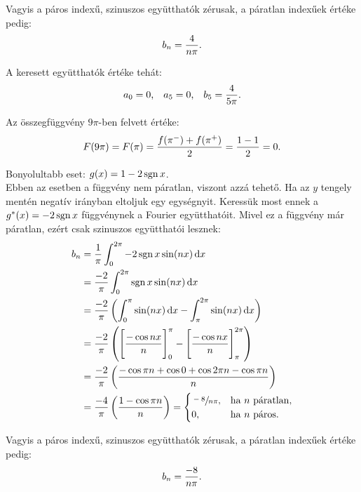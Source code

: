 \begin{exercise}
{    Vagyis a páros indexű, szinuszos együtthatók zérusak, a páratlan indexűek
    értéke pedig:
    \[
      b_n = \frac{4}{n\pi}
      \text.
    \]

    A keresett együtthatók értéke tehát:
    \[
      a_0 = 0
      \text,
      \quad
      a_5 = 0
      \text,
      \quad
      b_5 = \frac{4}{5 \pi}
      \text.
    \]

    Az összegfüggvény $9\pi$-ben felvett értéke:
    \[
      F(9 \pi) = F(\pi) = \frac{f(\pi^-) + f(\pi^+)}{2} = \frac{1-1}{2} = 0
      \text.
    \]

    \tcbline

    Bonyolultabb eset: $g(x) = 1 - 2\operatorname{sgn} x$. \\[3mm]
    Ebben az esetben a függvény nem páratlan, viszont azzá tehető. Ha az $y$
    tengely mentén negatív irányban eltoljuk egy egységnyit. Keressük most ennek
    a $g^*(x) = -2 \operatorname{sgn} x$ függvénynek a Fourier együtthatóit. Mivel ez a
    függvény már páratlan, ezért csak szinuszos együtthatói lesznek:
    \begin{align*}
      b_n
       & = \frac{1}{\pi} \int_0^{2\pi} -2\sgn x \sin(n x) \, \mathrm d x
      \\
       & = \frac{-2}{\pi} \int_0^{2\pi} \sgn x \sin(n x) \, \mathrm d x
      \\
       & = \frac{-2}{\pi} \left(
      \int_0^{\pi} \sin(n x) \, \mathrm d x -
      \int_\pi^{2\pi} \sin(n x) \, \mathrm d x
      \right)
      \\
       & = \frac{-2}{\pi} \left(
      \Bigg[ \frac{-\cos nx}{n} \Bigg]_{0}^{\pi} -
      \Bigg[ \frac{-\cos nx}{n} \Bigg]_{\pi}^{2\pi}
      \right)
      \\
       & = \frac{-2}{\pi} \left(
      \frac{%
        - \cos \pi n
        + \cos 0
        + \cos 2 \pi n
        - \cos \pi n
      }{n}
      \right)
      \\
       & = \frac{-4}{\pi} \left(
      \frac{1 - \cos \pi n}{n}
      \right)
      = \begin{cases}
          \sfrac{-8}{n \pi}, & \text{ha } n \text{ páratlan,} \\
          0,                 & \text{ha } n \text{ páros.}
        \end{cases}
    \end{align*}

    Vagyis a páros indexű, szinuszos együtthatók zérusak, a páratlan indexűek
    értéke pedig:
    \[
      b_n = \frac{-8}{n\pi}
      \text.
    \]

}
\end{exercise}
